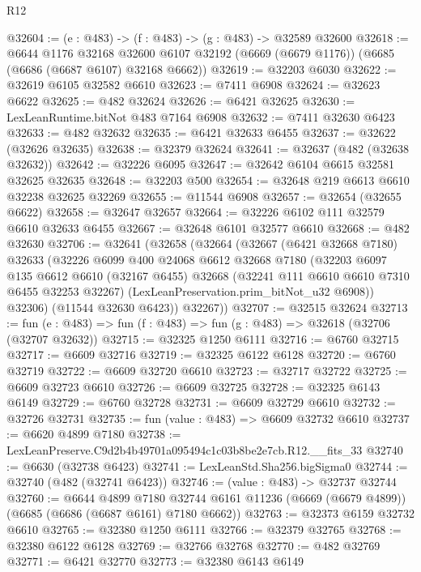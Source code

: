 \begin{lexlean}{R12}
\begin{coremodule}
@32604 := (e : @483) -> (f : @483) -> (g : @483) -> @32589 @32600
@32618 := @6644
    @1176
    @32168
    @32600
    @6107
    @32192
    (@6669 (@6679 @1176))
    (@6685 (@6686 (@6687 @6107) @32168 @6662))
@32619 := @32203 @6030
@32622 := @32619 @6105 @32582 @6610
@32623 := @7411 @6908
@32624 := @32623 @6622
@32625 := @482 @32624
@32626 := @6421 @32625
@32630 := LexLeanRuntime.bitNot @483 @7164 @6908
@32632 := @7411 @32630 @6423
@32633 := @482 @32632
@32635 := @6421 @32633 @6455
@32637 := @32622 (@32626 @32635)
@32638 := @32379 @32624
@32641 := @32637 (@482 (@32638 @32632))
@32642 := @32226 @6095
@32647 := @32642 @6104 @6615 @32581 @32625 @32635
@32648 := @32203 @500
@32654 := @32648 @219 @6613 @6610 @32238 @32625 @32269
@32655 := @11544 @6908
@32657 := @32654 (@32655 @6622)
@32658 := @32647 @32657
@32664 := @32226 @6102 @111 @32579 @6610 @32633 @6455
@32667 := @32648 @6101 @32577 @6610
@32668 := @482 @32630
@32706 := @32641
    (@32658
      (@32664
        (@32667
          (@6421 @32668 @7180)
          @32633
          (@32226
            @6099
            @400
            @24068
            @6612
            @32668
            @7180
            (@32203
              @6097
              @135
              @6612
              @6610
              (@32167 @6455)
              @32668
              (@32241 @111 @6610 @6610 @7310 @6455 @32253 @32267)
              (LexLeanPreservation.prim_bitNot_u32 @6908))
            @32306)
          (@11544 @32630 @6423))
        @32267))
@32707 := @32515 @32624
@32713 := fun (e : @483) => fun (f : @483) => fun (g : @483) => @32618 (@32706 (@32707 @32632))
@32715 := @32325 @1250 @6111
@32716 := @6760 @32715
@32717 := @6609 @32716
@32719 := @32325 @6122 @6128
@32720 := @6760 @32719
@32722 := @6609 @32720 @6610
@32723 := @32717 @32722
@32725 := @6609 @32723 @6610
@32726 := @6609 @32725
@32728 := @32325 @6143 @6149
@32729 := @6760 @32728
@32731 := @6609 @32729 @6610
@32732 := @32726 @32731
@32735 := fun (value : @483) => @6609 @32732 @6610
@32737 := @6620 @4899 @7180
@32738 := LexLeanPreserve.C9d2b4b49701a095494c1c03b8be2e7cb.R12.__fits_33
@32740 := @6630 (@32738 @6423)
@32741 := LexLeanStd.Sha256.bigSigma0
@32744 := @32740 (@482 (@32741 @6423))
@32746 := (value : @483) -> @32737 @32744
@32760 := @6644
    @4899
    @7180
    @32744
    @6161
    @11236
    (@6669 (@6679 @4899))
    (@6685 (@6686 (@6687 @6161) @7180 @6662))
@32763 := @32373 @6159 @32732 @6610
@32765 := @32380 @1250 @6111
@32766 := @32379 @32765
@32768 := @32380 @6122 @6128
@32769 := @32766 @32768
@32770 := @482 @32769
@32771 := @6421 @32770
@32773 := @32380 @6143 @6149

\end{coremodule}
\end{lexlean}
